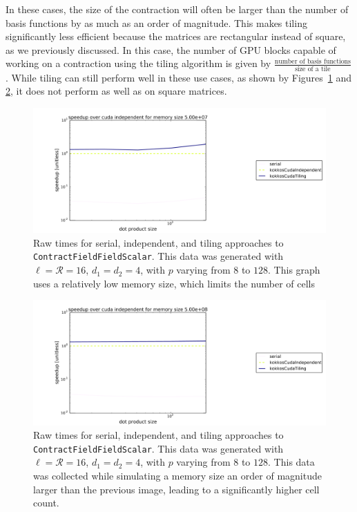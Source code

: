 In these cases, the size of the contraction will often be larger than the number
of basis functions by as much as an order of magnitude. This makes tiling
significantly less efficient because the matrices are rectangular instead of
square, as we previously discussed. In this case, the number of GPU blocks
capable of working on a contraction using the tiling algorithm is given by
$\frac{\text{number of basis functions}}{\text{size of a tile}}$. While tiling
can still perform well in these use cases, as shown by
Figures~\ref{fig:multiDTiling1} and \ref{fig:multiDTiling2}, it does not perform
as well as on square matrices.

\begin{figure}[H]
    \centering
\includegraphics[scale = .2]{CFFTTiling1}
\caption{Raw times for serial, independent, and tiling approaches to \texttt{ContractFieldFieldScalar}. This data was generated with $\ell=\mathcal{R}=16$, $d_1=d_2=4$, with $p$ varying from $8$ to $128$. This graph uses a relatively low memory size, which limits the number of cells}
\label{fig:multiDTiling1}
\end{figure}

\begin{figure}[H]
    \centering
\includegraphics[scale = .2]{CFFTTiling2}
\caption{Raw times for serial, independent, and tiling approaches to \texttt{ContractFieldFieldScalar}. This data was generated with $\ell=\mathcal{R}=16$, $d_1=d_2=4$, with $p$ varying from $8$ to $128$. This data was collected while simulating a memory size an order of magnitude larger than the previous image, leading to a significantly higher cell count. }
\label{fig:multiDTiling2}
\end{figure}

